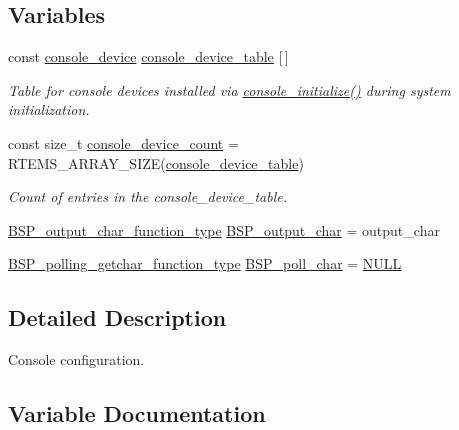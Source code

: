 \subsection*{Variables}
\begin{DoxyCompactItemize}
\item 
const \mbox{\hyperlink{structconsole__device}{console\+\_\+device}} \mbox{\hyperlink{group__ConsoleTermios_ga7f058e756eb724397922b823131fba5c}{console\+\_\+device\+\_\+table}} \mbox{[}$\,$\mbox{]}
\begin{DoxyCompactList}\small\item\em Table for console devices installed via \mbox{\hyperlink{arm_2raspberrypi_2console_2console-config_8c_a4bdc321ef3ab62a261d77b5dbe075566}{console\+\_\+initialize()}} during system initialization. \end{DoxyCompactList}\item 
const size\+\_\+t \mbox{\hyperlink{group__ConsoleTermios_gabca2c9c9873b0482f9fd306e6bade017}{console\+\_\+device\+\_\+count}} = R\+T\+E\+M\+S\+\_\+\+A\+R\+R\+A\+Y\+\_\+\+S\+I\+ZE(\mbox{\hyperlink{group__ConsoleTermios_ga7f058e756eb724397922b823131fba5c}{console\+\_\+device\+\_\+table}})
\begin{DoxyCompactList}\small\item\em Count of entries in the console\+\_\+device\+\_\+table. \end{DoxyCompactList}\item 
\mbox{\hyperlink{bspIo_8h_a0b0dff1c3d35110ae303b4098c60dc14}{B\+S\+P\+\_\+output\+\_\+char\+\_\+function\+\_\+type}} \mbox{\hyperlink{powerpc_2qoriq_2console_2console-config_8c_a5fb8c9c4f076f0340b4a17ed432ced5c}{B\+S\+P\+\_\+output\+\_\+char}} = output\+\_\+char
\item 
\mbox{\hyperlink{bspIo_8h_a132b9ceff428a634ece5dfaac7ef1006}{B\+S\+P\+\_\+polling\+\_\+getchar\+\_\+function\+\_\+type}} \mbox{\hyperlink{powerpc_2qoriq_2console_2console-config_8c_ae5846eecdfa8f2813504371bf01c29b0}{B\+S\+P\+\_\+poll\+\_\+char}} = \mbox{\hyperlink{bestcomm__api_8h_a872bb74de61c3689ccd5b41873fce42c}{N\+U\+LL}}
\end{DoxyCompactItemize}


\subsection{Detailed Description}
Console configuration. 



\subsection{Variable Documentation}
\mbox{\label{powerpc_2qoriq_2console_2console-config_8c_a5fb8c9c4f076f0340b4a17ed432ced5c}} 
